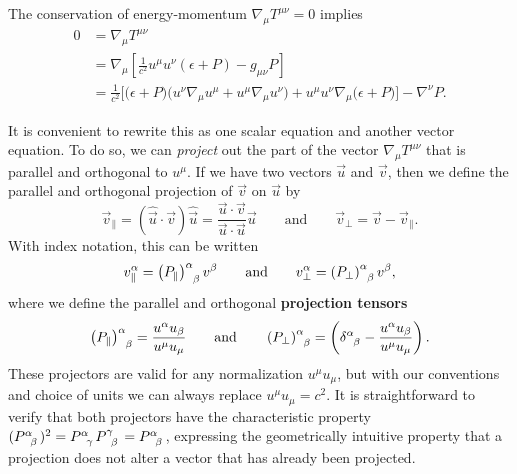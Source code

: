 The conservation of energy-momentum $\nabla_\mu T^{\mu \nu} = 0$ implies
\begin{align}
	0 &= \nabla_\mu T^{\mu \nu} \nonumber \\
	  &= \nabla_\mu \left[ \frac{1}{c^2} u^\mu u^\nu (\epsilon + P) - g_{\mu \nu} P \right] \nonumber \\
	  &= \frac{1}{c^2} \bigg[ \Big( \epsilon + P \Big) \Big( u^\nu \nabla_\mu u^\mu + u^\mu \nabla_\mu u^\nu \Big) + u^\mu u^\nu \nabla_\mu \Big( \epsilon + P \Big) \bigg] - \nabla^\nu P . \label{eq:relfluid:conservation_energy_momentum}
\end{align}

It is convenient to rewrite this as one scalar equation and another vector equation.
To do so, we can \emph{project} out the part of the vector $\nabla_\mu T^{\mu \nu}$ that is parallel and orthogonal to $u^\mu$.
If we have two vectors $\vec{u}$ and $\vec{v}$, then we define the parallel and orthogonal projection of $\vec{v}$ on $\vec{u}$ by
\begin{equation}
	\vec{v}_\parallel = \left( \hat{\vec{u}} \cdot \vec{v} \right) \hat{\vec{u}} = \frac{\vec{u} \cdot \vec{v}}{\vec{u} \cdot \vec{u}} \vec{u}
	\qquad \text{and} \qquad
	\vec{v}_\perp = \vec{v} - \vec{v}_\parallel .
\end{equation}
With index notation, this can be written
\begin{equation}
	v_\parallel^\alpha = \left(P_\parallel\right)\indices{^\alpha_\beta} v^\beta
	\qquad \text{and} \qquad
	v_\perp^\alpha = \left(P_\perp\right)\indices{^\alpha_\beta} v^\beta ,
\end{equation}
where we define the parallel and orthogonal \textbf{projection tensors}
\begin{equation}
	\left(P_\parallel\right) \indices{^\alpha_\beta} = \frac{u^\alpha u_\beta}{u^\mu u_\mu}
	\qquad \text{and} \qquad
	\left(P_\perp\right) \indices{^\alpha_\beta} = \left( \delta\indices{^\alpha_\beta} - \frac{u^\alpha u_\beta}{u^\mu u_\mu} \right) .
\label{eq:relfluid:projection_tensors}
\end{equation}
These projectors are valid for any normalization $u^\mu u_\mu$, but with our conventions and choice of units we can always replace $u^\mu u_\mu = c^2$.
It is straightforward to verify that both projectors have the characteristic property $( P\indices{^\alpha_\beta} )^2 = P\indices{^\alpha_\gamma} P\indices{^\gamma_\beta} = P\indices{^\alpha_\beta}$,
expressing the geometrically intuitive property that a projection does not alter a vector that has already been projected.

